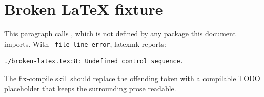 \documentclass{article}
\begin{document}
\section{Broken LaTeX fixture}

This paragraph calls \undefinedcmd, which is not defined by any package this
document imports. With \texttt{-file-line-error}, latexmk reports:

\begin{verbatim}
./broken-latex.tex:8: Undefined control sequence.
\end{verbatim}

The fix-compile skill should replace the offending token with a compilable
TODO placeholder that keeps the surrounding prose readable.
\end{document}
